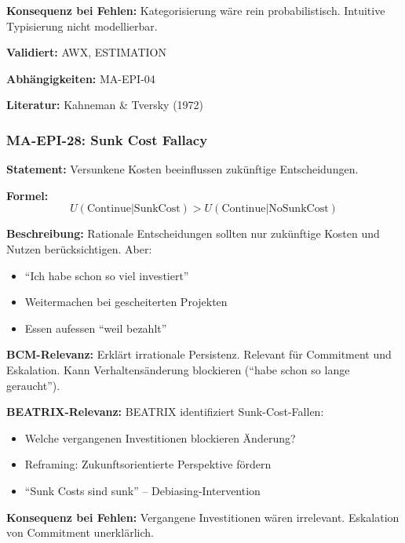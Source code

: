 \textbf{Konsequenz bei Fehlen:}
Kategorisierung wäre rein probabilistisch. Intuitive Typisierung nicht modellierbar.

\textbf{Validiert:} AWX, ESTIMATION

\textbf{Abhängigkeiten:} MA-EPI-04

\textbf{Literatur:} Kahneman \& Tversky (1972)


\subsubsection*{MA-EPI-28: Sunk Cost Fallacy}

\textbf{Statement:} Versunkene Kosten beeinflussen zukünftige Entscheidungen.

\textbf{Formel:}
\begin{equation}
U(\text{Continue}|\text{SunkCost}) > U(\text{Continue}|\text{NoSunkCost})
\end{equation}

\textbf{Beschreibung:}
Rationale Entscheidungen sollten nur zukünftige Kosten und Nutzen berücksichtigen. Aber:
\begin{itemize}
    \item ``Ich habe schon so viel investiert''
    \item Weitermachen bei gescheiterten Projekten
    \item Essen aufessen ``weil bezahlt''
\end{itemize}

\textbf{BCM-Relevanz:}
Erklärt irrationale Persistenz. Relevant für Commitment und Eskalation. Kann Verhaltensänderung blockieren (``habe schon so lange geraucht'').

\textbf{BEATRIX-Relevanz:}
BEATRIX identifiziert Sunk-Cost-Fallen:
\begin{itemize}
    \item Welche vergangenen Investitionen blockieren Änderung?
    \item Reframing: Zukunftsorientierte Perspektive fördern
    \item ``Sunk Costs sind sunk'' -- Debiasing-Intervention
\end{itemize}

\textbf{Konsequenz bei Fehlen:}
Vergangene Investitionen wären irrelevant. Eskalation von Commitment unerklärlich.


